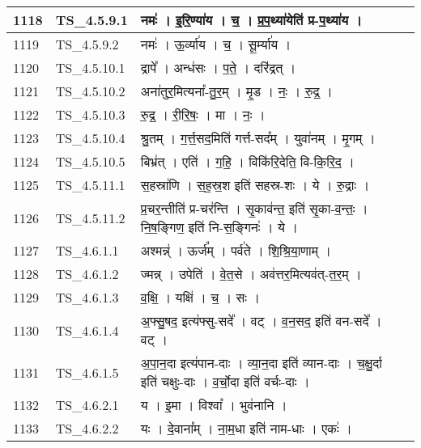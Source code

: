 \documentclass[17pt]{extarticle}
\begin{document}
\begin{longtable}{||p{0.4in}||p{0.9in}||p{4.0in}||p{0.9in}||}
            1118 & TS\_4.5.9.1 & नमः॑   ।   इ॒रि॒ण्या॑य   ।   च॒   ।   प्र॒प॒थ्या॑येति॑ प्र{-}प॒थ्या॑य   ।    &      \\
        \hline
            1119 & TS\_4.5.9.2 & नमः॑   ।   ऊ॒र्व्या॑य   ।   च॒   ।   सू॒र्म्या॑य   ।    &      \\
        \hline
            1120 & TS\_4.5.10.1 & द्रापे᳚   ।   अन्ध॑सः   ।   प॒ते॒   ।   दरि॑द्रत्   ।    &      \\
        \hline
            1121 & TS\_4.5.10.2 & अना॑तुर॒मित्यना᳚{-}तु॒र॒म्   ।   मृ॒ड   ।   नः॒   ।   रु॒द्र॒   ।    &      \\
        \hline
            1122 & TS\_4.5.10.3 & रु॒द्र॒   ।   री॒रि॒षः॒   ।   मा   ।   नः॒   ।    &      \\
        \hline
            1123 & TS\_4.5.10.4 & श्रु॒तम्   ।   ग॒र्त्त॒सद॒मिति॑ गर्त्त{-}सद᳚म्   ।   युवा॑नम्   ।   मृ॒गम्   ।    &      \\
        \hline
            1124 & TS\_4.5.10.5 & बिभ्र॑त्   ।   एति॑   ।   ग॒हि॒   ।   विकि॑रि॒देति॒ वि{-}कि॒रि॒द॒   ।    &      \\
        \hline
            1125 & TS\_4.5.11.1 & स॒हस्रा॑णि   ।   स॒ह॒स्र॒श इति॑ सहस्र{-}शः   ।   ये   ।   रु॒द्राः   ।    &      \\
        \hline
            1126 & TS\_4.5.11.2 & प्र॒चर॒न्तीति॑ प्र{-}चर॑न्ति   ।   सृ॒काव॑न्त॒ इति॑ सृ॒का{-}व॒न्तः॒   ।   नि॒ष॒ङ्गिण॒ इति॑ नि{-}स॒ङ्गिनः॑   ।   ये   ।    &      \\
        \hline
            1127 & TS\_4.6.1.1 & अश्मन्न्॑   ।   ऊर्ज᳚म्   ।   पर्व॑ते   ।   शि॒श्रि॒या॒णाम्   ।    &      \\
        \hline
            1128 & TS\_4.6.1.2 & ज्मन्न्   ।   उपेति॑   ।   वे॒त॒से   ।   अव॑त्तर॒मित्यव॑त्{-}त॒र॒म्   ।    &      \\
        \hline
            1129 & TS\_4.6.1.3 & व॒क्षि॒   ।   यक्षि॑   ।   च॒   ।   सः   ।    &      \\
        \hline
            1130 & TS\_4.6.1.4 & अ॒फ्सु॒षद॒ इत्य॑फ्सु{-}सदे᳚   ।   वट्   ।   व॒न॒सद॒ इति॑ वन{-}सदे᳚   ।   वट्   ।    &      \\
        \hline
            1131 & TS\_4.6.1.5 & अ॒पा॒न॒दा इत्य॑पान{-}दाः   ।   व्या॒न॒दा इति॑ व्यान{-}दाः   ।   च॒क्षु॒र्दा इति॑ चक्षुः{-}दाः   ।   व॒र्चो॒दा इति॑ वर्चः{-}दाः   ।    &      \\
        \hline
            1132 & TS\_4.6.2.1 & य   ।   इ॒मा   ।   विश्वा᳚   ।   भुव॑नानि   ।    &      \\
        \hline
            1133 & TS\_4.6.2.2 & यः   ।   दे॒वाना᳚म्   ।   ना॒म॒धा इति॑ नाम{-}धाः   ।   एकः॑   ।    &      \\

\end{longtable}
\end{document}

